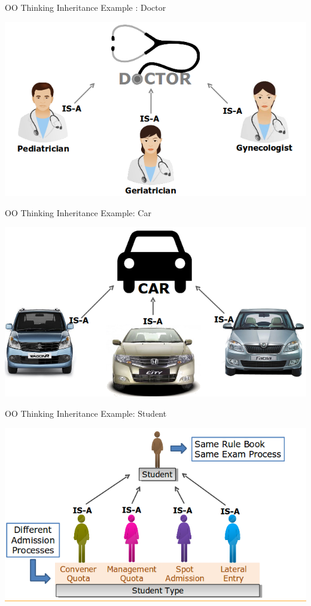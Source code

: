 \documentclass[14pt]{beamer}
\begin{document}
\begin{frame}{OO Thinking}
Inheritance Example : Doctor
\begin{center}
    \includegraphics[scale=0.5]{Image16.png}
\end{center}
\end{frame}
\begin{frame}{OO Thinking}
Inheritance Example: Car
\begin{center}
    \includegraphics[scale=0.5]{Image17.png}
\end{center}
\end{frame}
\begin{frame}{OO Thinking}
Inheritance Example: Student
\begin{center}
    \includegraphics[scale=0.5]{Image18.png}
\end{center}
\end{frame}
\end{document}

